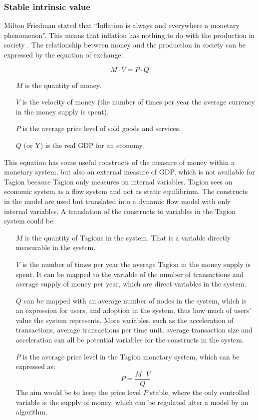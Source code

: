 \subsubsection{Stable intrinsic value}
Milton Friedman stated that ``Inflation is always and everywhere a monetary phenomenon''. This means that inflation has nothing to do with the production in society \cite{friedman_counter}. The relationship between money and the production in society can be expressed by the equation of exchange: \cite{britannica_monetarism}

\begin{equation}
 M \cdot V = P \cdot Q
 \label{eq:equation_of_exchange}
\end{equation}

\begin{itemize}
 \item[$M$]is the quantity of money. 
 \item[$V$]is the velocity of money (the number of times per year the average currency in the money supply is spent).
 \item[$P$]is the average price level of sold goods and services.
 \item[$Q$](or Y) is the real GDP for an economy.
\end{itemize}

This equation has some useful constructs of the measure of money within a monetary system, but also an external measure of GDP, which is not available for Tagion because Tagion only measures on internal variables. Tagion sees an economic system as a flow system and not as static equilibrium. The constructs in the model are used but translated into a dynamic flow model with only internal variables. A translation of the constructs to variables in the Tagion system could be: 

\begin{itemize}
 \item[$M$]is the quantity of Tagions in the system. That is a variable directly measurable in the system.  
 \item[$V$]is the number of times per year the average Tagion in the money supply is spent. It can be mapped to the variable of the number of transactions and average supply of money per year, which are direct variables in the system. 
 \item[$Q$]can be mapped with an average number of nodes in the system, which is an expression for users, and adoption in the system, thus how much of users' value the system represents. More variables, such as the acceleration of transactions, average transactions per time unit, average transaction size and acceleration can all be potential variables for the constructs in the system.
 \item[$P$]is the average price level in the Tagion monetary system, which can be expressed as: 
 \begin{equation}
  P = \frac{M \cdot V}{Q}
 \end{equation}
 The aim would be to keep the price level $P$ stable, where the only controlled variable is the supply of money, which can be regulated after a model by an algorithm. 
\end{itemize}

